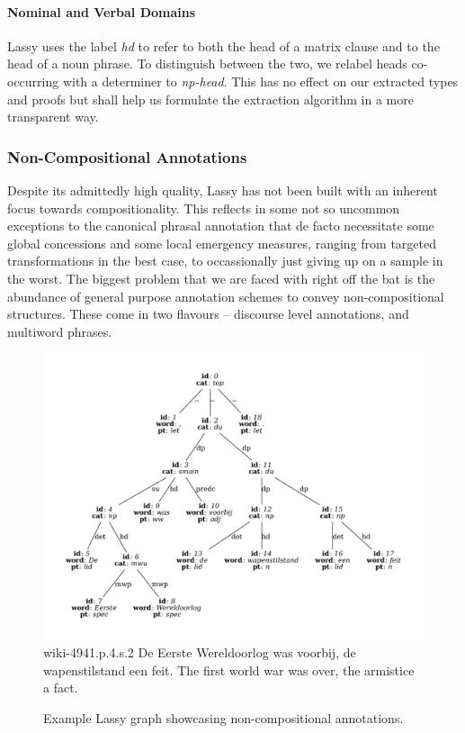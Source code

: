 \paragraph{Nominal and Verbal Domains}
Lassy uses the label \textit{hd} to refer to both the head of a matrix clause and to the head of a noun phrase.
To distinguish between the two, we relabel heads co-occurring with a determiner to \textit{np-head}.
This has no effect on our extracted types and proofs but shall help us formulate the extraction algorithm in a more transparent way.

\subsubsection{Non-Compositional Annotations}
Despite its admittedly high quality, Lassy has not been built with an inherent focus towards compositionality.
This reflects in some not so uncommon exceptions to the canonical phrasal annotation that de facto necessitate some global concessions and some local emergency measures, ranging from targeted transformations in the best case, to occassionally just giving up on a sample in the worst.
The biggest problem that we are faced with right off the bat is the abundance of general purpose annotation schemes to convey non-compositional structures.
These come in two flavours -- discourse level annotations, and multiword phrases.

\begin{figure}
	\includegraphics[width=1\textwidth,trim={1.25cm 0 1.25cm 0}, clip]{./prebuilt/du_mwp_example.pdf}
	\lassycap
		{wiki-4941.p.4.s.2}
		{De Eerste Wereldoorlog was voorbij, de wapenstilstand een feit.}
		{The first world war was over, the armistice a fact.}
	\caption{Example Lassy graph showcasing non-compositional annotations.}
	\label{figure:du_mwp_example}
\end{figure}

